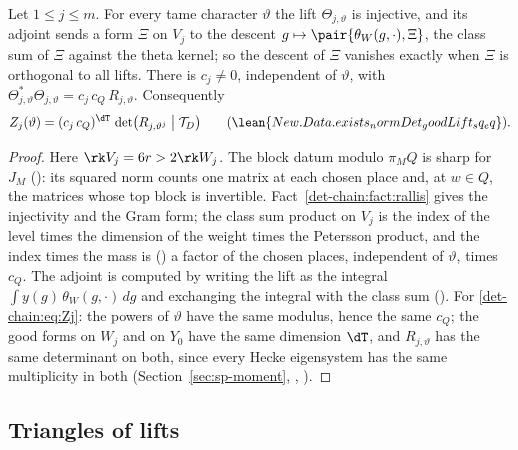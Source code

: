 \begin{proposition}
\label{det-chain:prop:onelift}
Let $1\le j\le m$. For every tame character $\vartheta$ the lift $\Theta_{j,\vartheta}$ is
injective, and its adjoint sends a form $\Xi$ on $V_j$ to the descent
$g\mapsto\pair{\theta_W(g,\cdot),\Xi}$, the class sum of $\Xi$ against the theta kernel; so the
descent of $\Xi$ vanishes exactly when $\Xi$ is orthogonal to all lifts. There is $c_j\ne0$,
independent of $\vartheta$, with
$\Theta_{j,\vartheta}^*\Theta_{j,\vartheta}=c_j\,c_Q\,R_{j,\vartheta}$. Consequently
\begin{equation}\label{det-chain:eq:Zj}
  Z_j(\vartheta)=(c_j\,c_Q)^{\dT}\,\det\bigl(R_{j,\vartheta^j}\bigm|\mathcal{T}_D\bigr)
  \qquad(\lean{New.Data.exists_normDet_goodLift_sq_eq}).
\end{equation}
\end{proposition}

\begin{proof}
Here $\rk V_j=6r>2\rk W_j$. The block datum modulo $\pi_MQ$ is sharp for $J_M$
(): its squared norm counts one matrix at each chosen place
and, at $w\in Q$, the matrices whose top block is invertible. Fact~\ref{det-chain:fact:rallis}
gives the injectivity and the Gram form; the class sum product on $V_j$ is the index of the level
times the dimension of the weight times the Petersson product, and the index times the mass is
() a factor of the chosen places, independent of
$\vartheta$, times $c_Q$. The adjoint is computed by writing the lift as the integral
$\int y(g)\,\theta_W(g,\cdot)\,dg$ and exchanging the integral with the class sum
(). For \eqref{det-chain:eq:Zj}: the powers of $\vartheta$
have the same modulus, hence the same $c_Q$; the good forms on $W_j$ and on $Y_0$ have the same
dimension $\dT$, and $R_{j,\vartheta}$ has the same determinant on both, since every Hecke
eigensystem has the same multiplicity in both (Section~\ref{sec:sp-moment},
, ).
\end{proof}

\subsection{Triangles of lifts}\label{det-chain:sec:triangle}

